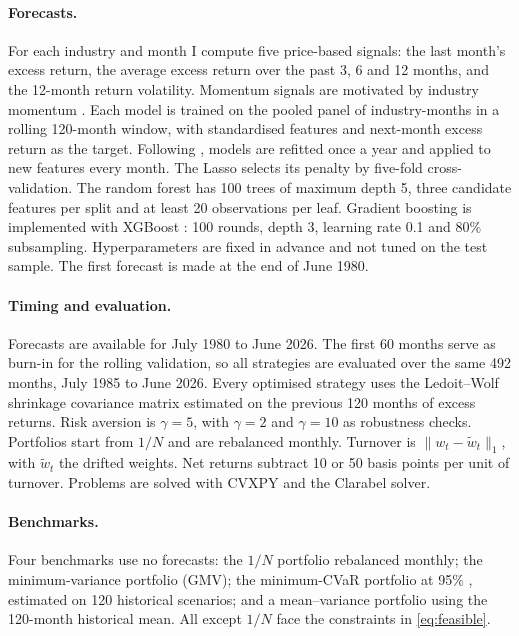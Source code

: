 \documentclass[11pt]{article}
\begin{document}
\paragraph{Forecasts.} For each industry and month I compute five price-based signals: the last month's excess return, the average excess return over the past 3, 6 and 12 months, and the 12-month return volatility. Momentum signals are motivated by industry momentum \citep{moskowitz1999}. Each model is trained on the pooled panel of industry-months in a rolling 120-month window, with standardised features and next-month excess return as the target. Following \citet{gu2020}, models are refitted once a year and applied to new features every month. The Lasso \citep{tibshirani1996} selects its penalty by five-fold cross-validation. The random forest \citep{breiman2001} has 100 trees of maximum depth 5, three candidate features per split and at least 20 observations per leaf. Gradient boosting \citep{friedman2001} is implemented with XGBoost \citep{chen2016}: 100 rounds, depth 3, learning rate 0.1 and 80\% subsampling. Hyperparameters are fixed in advance and not tuned on the test sample. The first forecast is made at the end of June 1980.

\paragraph{Timing and evaluation.} Forecasts are available for July 1980 to June 2026. The first 60 months serve as burn-in for the rolling validation, so all strategies are evaluated over the same 492 months, July 1985 to June 2026. Every optimised strategy uses the Ledoit--Wolf shrinkage covariance matrix \citep{ledoit2004} estimated on the previous 120 months of excess returns. Risk aversion is $\gamma=5$, with $\gamma=2$ and $\gamma=10$ as robustness checks. Portfolios start from $1/N$ and are rebalanced monthly. Turnover is $\lVert w_t-\tilde w_t\rVert_1$, with $\tilde w_t$ the drifted weights. Net returns subtract 10 or 50 basis points per unit of turnover. Problems are solved with CVXPY and the Clarabel solver.

\paragraph{Benchmarks.} Four benchmarks use no forecasts: the $1/N$ portfolio rebalanced monthly; the minimum-variance portfolio (GMV); the minimum-CVaR portfolio at 95\% \citep{rockafellar2000}, estimated on 120 historical scenarios; and a mean--variance portfolio using the 120-month historical mean. All except $1/N$ face the constraints in \eqref{eq:feasible}.
\end{document}
